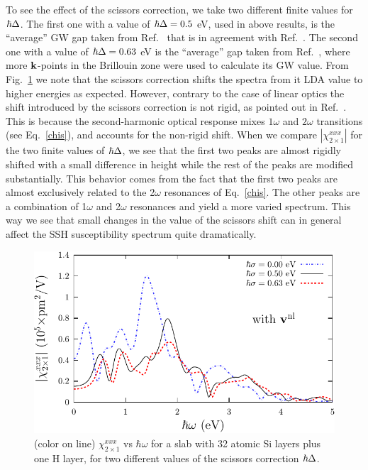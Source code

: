 \documentclass[floatfix,prb,aps,superscriptaddress,showpacs,11pt,preprint,letterpaper]{revtex4}
\begin{document}
To see the effect of the scissors correction, we take two different
finite values for $\hbar\Delta$. The first one
with a value of $\hbar\Delta=0.5$ eV, used in above results, 
is the ``average'' GW gap taken from 
Ref.~ 
that is in agreement with Ref.~. The second one
with a value of $\hbar\Delta=0.63$ eV is the ``average'' 
gap taken from Ref.~, 
where more $\mathbf{k}$-points in the Brillouin zone were 
used to calculate its GW value.
From Fig.~\ref{fig4}
we note that the scissors correction 
shifts the spectra from it LDA value to higher energies as expected.
 However, contrary 
to the case of linear optics\cite{cabellosPRB09} the shift introduced 
by the scissors correction is not 
rigid, as pointed out in Ref.~. 
 This is because the second-harmonic optical response mixes 
$1\omega$ and $2\omega$ transitions (see Eq.~\eqref{chis}), and accounts 
for the non-rigid shift. 
When we compare 
$|\chi^{xxx}_{2\times 1}|$ for the two finite values of $\hbar\Delta$,
we see that the first two peaks are almost rigidly 
shifted with a small difference in height while
the rest of the peaks are modified substantially. 
This behavior comes from the fact that the first two
peaks are almost exclusively related to the 
2$\omega$ resonances of
Eq.~\eqref{chis}. The other peaks are a combination 
of 1$\omega$ and 2$\omega$ resonances 
and yield a more varied spectrum. 
This way we see that small changes in the value of the 
scissors shift can in general affect the SSH susceptibility 
spectrum quite dramatically.
\begin{figure}
\centering 
\includegraphics[scale=.8]{plots/fig4}
\caption{(color on line) 
$\chi^{xxx}_{2\times 1}$
vs $\hbar\omega$ for a slab with 32 
atomic Si layers plus one H layer, 
for two different values of 
the scissors correction $\hbar\Delta$. 
\label{fig4}} 
\end{figure}
\end{document}

